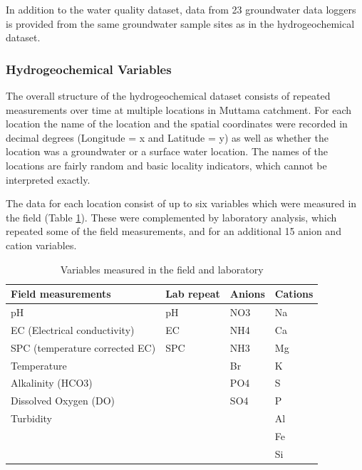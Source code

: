 \documentclass[, manuscript]{copernicus}
\begin{document}
In addition to the water quality dataset, data from 23 groundwater data
loggers is provided from the same groundwater sample sites as in the
hydrogeochemical dataset.

\subsubsection{Hydrogeochemical Variables}

The overall structure of the hydrogeochemical dataset consists of
repeated measurements over time at multiple locations in Muttama
catchment. For each location the name of the location and the spatial
coordinates were recorded in decimal degrees (Longitude = x and Latitude
= y) as well as whether the location was a groundwater or a surface
water location. The names of the locations are fairly random and basic
locality indicators, which cannot be interpreted exactly.

The data for each location consist of up to six variables which were
measured in the field (Table \ref{tab:TableMeasurements}). These were
complemented by laboratory analysis, which repeated some of the field
measurements, and for an additional 15 anion and cation variables.

\clearpage

\begin{table}
\centering
\caption{\label{tab:TableMeasurements}Variables measured in the field and laboratory}
\centering
\begin{tabular}[t]{l|l|l|l}
\hline
Field measurements & Lab repeat & Anions & Cations\\
\hline
pH & pH & NO3 & Na\\
\hline
EC (Electrical conductivity) & EC & NH4 & Ca\\
\hline
SPC (temperature corrected EC) & SPC & NH3 & Mg\\
\hline
Temperature &  & Br & K\\
\hline
Alkalinity (HCO3) &  & PO4 & S\\
\hline
Dissolved Oxygen (DO) &  & SO4 & P\\
\hline
Turbidity &  &  & Al\\
\hline
 &  &  & Fe\\
\hline
 &  &  & Si\\
\hline
\end{tabular}
\end{table}
\end{document}
